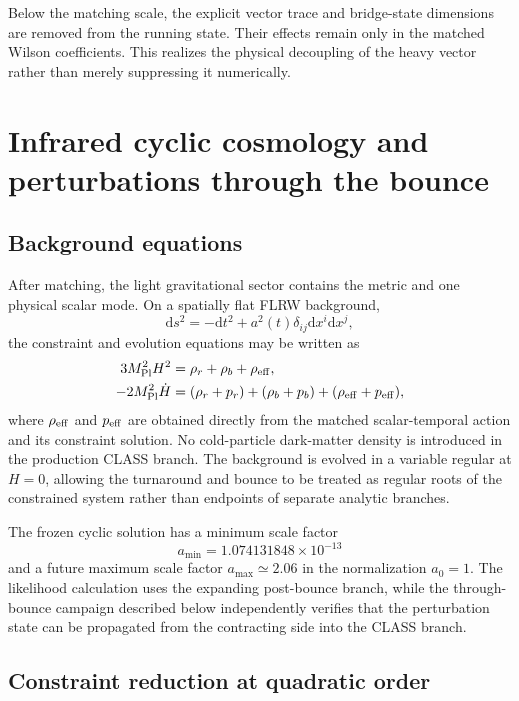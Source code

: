 \documentclass[12pt]{iopart}
\newcommand{\mpl}{M_{\rm Pl}}
\newcommand{\dd}{\mathrm{d}}
\begin{document}
Below the matching scale, the explicit vector trace and bridge-state dimensions are removed from the running state.  Their effects remain only in the matched Wilson coefficients.  This realizes the physical decoupling of the heavy vector rather than merely suppressing it numerically.

\section{Infrared cyclic cosmology and perturbations through the bounce}
\label{sec:cyclic}

\subsection{Background equations}

After matching, the light gravitational sector contains the metric and one physical scalar mode.  On a spatially flat FLRW background,
\begin{equation}
\dd s^2=-\dd t^2+a^2(t)\delta_{ij}\dd x^i\dd x^j,
\end{equation}
the constraint and evolution equations may be written as
\begin{align}
3\mpl^2H^2 &= \rho_r+\rho_b+\rho_{\rm eff},\label{eq:friedmann}\\
-2\mpl^2\dot H &= (\rho_r+p_r)+(\rho_b+p_b)+(\rho_{\rm eff}+p_{\rm eff}),\label{eq:raych}\end{align}
where $\rho_{\rm eff}$ and $p_{\rm eff}$ are obtained directly from the matched scalar-temporal action and its constraint solution.  No cold-particle dark-matter density is introduced in the production CLASS branch.  The background is evolved in a variable regular at $H=0$, allowing the turnaround and bounce to be treated as regular roots of the constrained system rather than endpoints of separate analytic branches.

The frozen cyclic solution has a minimum scale factor
\begin{equation}
a_{\min}=1.074131848\times10^{-13}
\end{equation}
and a future maximum scale factor $a_{\max}\simeq2.06$ in the normalization $a_0=1$.  The likelihood calculation uses the expanding post-bounce branch, while the through-bounce campaign described below independently verifies that the perturbation state can be propagated from the contracting side into the CLASS branch.

\subsection{Constraint reduction at quadratic order}
\end{document}
